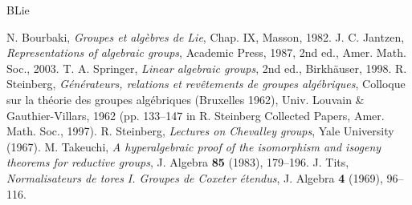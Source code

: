 \begin{thebibliography}{BLie}
\item[]
 N. Bourbaki, \textit{Groupes et algèbres de Lie}, Chap. IX, Masson, 1982.
 J. C. Jantzen, \textit{Representations of algebraic groups}, Academic Press, 1987, 2nd ed., Amer. Math. Soc., 2003.
 T. A. Springer, \textit{Linear algebraic groups}, 2nd ed., Birkhäuser, 1998.
 R. Steinberg, \textit{Générateurs, relations et revêtements de groupes algébriques}, Colloque sur la théorie des groupes algébriques (Bruxelles 1962), Univ. Louvain \& Gauthier-Villars, 1962 (pp. 133--147 in R. Steinberg Collected Papers, Amer. Math. Soc., 1997).
 R. Steinberg, \textit{Lectures on Chevalley groups}, Yale University (1967).
 M. Takeuchi, \textit{A hyperalgebraic proof of the isomorphism and isogeny theorems for reductive groups}, J. Algebra \textbf{85} (1983), 179--196.
 J. Tits, \textit{Normalisateurs de tores I. Groupes de Coxeter étendus}, J. Algebra \textbf{4} (1969), 96--116.
\end{thebibliography}
